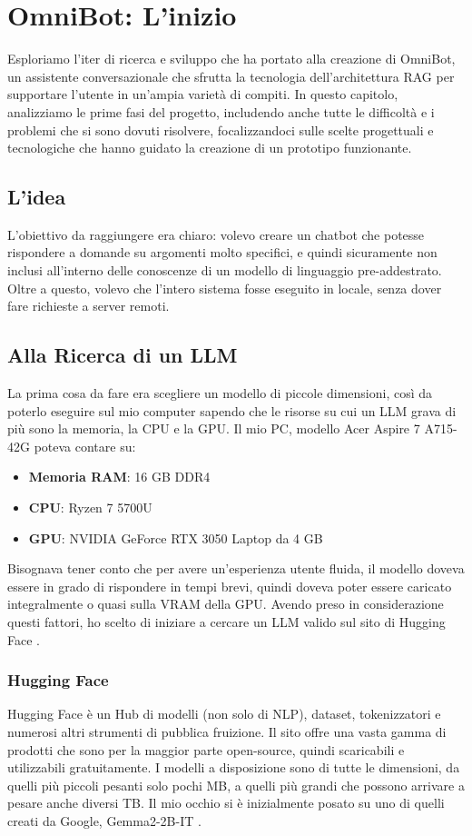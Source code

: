 \chapter{OmniBot: L'inizio}
\label{cap:omnibot1}
Esploriamo l'iter di ricerca e sviluppo che ha portato alla creazione di OmniBot, un assistente conversazionale che sfrutta la tecnologia dell'architettura RAG per supportare l'utente in un'ampia varietà di compiti. In questo capitolo, analizziamo le prime fasi del progetto, includendo anche tutte le difficoltà e i problemi che si sono dovuti risolvere, focalizzandoci sulle scelte progettuali e tecnologiche che hanno guidato la creazione di un prototipo funzionante.

\section{L'idea}
L'obiettivo da raggiungere era chiaro: volevo creare un chatbot che potesse rispondere a domande su argomenti molto specifici, e quindi sicuramente non inclusi all'interno delle conoscenze di un modello di linguaggio pre-addestrato. Oltre a questo, volevo che l'intero sistema fosse eseguito in locale, senza dover fare richieste a server remoti.

\section{Alla Ricerca di un LLM}
\label{sec:ricercallm}
La prima cosa da fare era scegliere un modello di piccole dimensioni, così da poterlo eseguire sul mio computer sapendo che le risorse su cui un LLM grava di più sono la memoria, la CPU e la GPU. Il mio PC, modello Acer Aspire 7 A715-42G poteva contare su:
\begin{itemize}
    \item \textbf{Memoria RAM}: 16 GB DDR4
    \item \textbf{CPU}: Ryzen 7 5700U
    \item \textbf{GPU}: NVIDIA GeForce RTX 3050 Laptop da 4 GB
\end{itemize}
Bisognava tener conto che per avere un'esperienza utente fluida, il modello doveva essere in grado di rispondere in tempi brevi, quindi doveva poter essere caricato integralmente o quasi sulla VRAM della GPU.
Avendo preso in considerazione questi fattori, ho scelto di iniziare a cercare un LLM valido sul sito di Hugging Face \cite{huggingfacehomepage}.

\subsection{Hugging Face}
Hugging Face è un Hub di modelli (non solo di NLP), dataset, tokenizzatori e numerosi altri strumenti di pubblica fruizione. Il sito offre una vasta gamma di prodotti che sono per la maggior parte open-source, quindi scaricabili e utilizzabili gratuitamente. I modelli a disposizione sono di tutte le dimensioni, da quelli più piccoli pesanti solo pochi MB, a quelli più grandi che possono arrivare a pesare anche diversi TB. Il mio occhio si è inizialmente posato su uno di quelli creati da Google, Gemma2-2B-IT \cite{gemma22bit}.

